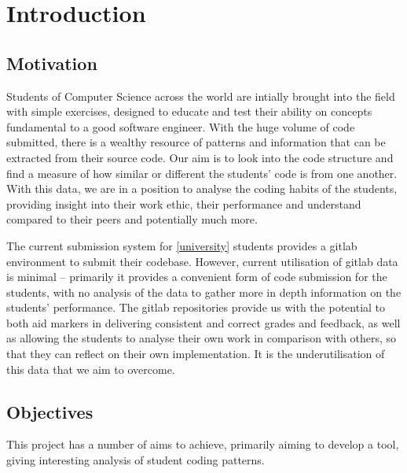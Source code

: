 
\chapter{Introduction} %

\label{Introduction} %


\section{Motivation}

Students of Computer Science across the world are intially brought into the field
with simple exercises, designed to educate and test their ability on concepts
fundamental to a good software engineer. With the huge volume of code submitted,
there is a wealthy resource of patterns and information that can be extracted
from their source code. Our aim is to look into the code structure and find
a measure of how similar or different the students' code is from one another.
With this data, we are in a position to analyse the coding habits of the students,
providing insight into their work ethic, their performance and understand compared
to their peers and potentially much more.

The current submission system for \ref{university} students provides a gitlab
environment to submit their codebase. However, current utilisation of gitlab 
data is minimal -- primarily it provides a
convenient form of code submission for the students, with no analysis of the 
data to gather more in depth information on the students' performance.
The gitlab repositories provide us with the potential to both aid markers
in delivering consistent and correct grades and feedback, as well as allowing
the students to analyse their own work in comparison with others, so that they
can reflect on their own implementation. It is the underutilisation of this
data that we aim to overcome.

\section{Objectives}
This project has a number of aims to achieve, primarily aiming to develop a 
tool, giving interesting analysis of student coding patterns. 


